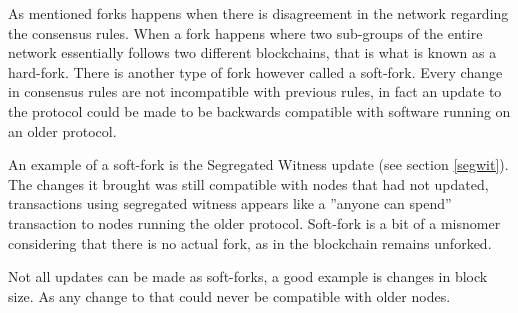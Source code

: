 \label{soft_hard_fork}
As mentioned forks happens when there is disagreement in the network regarding the consensus rules. When a fork happens where two sub-groups of the entire network essentially follows two different blockchains, that is what is known as a hard-fork. There is another type of fork however called a soft-fork.  Every change in consensus rules are not incompatible with previous rules, in fact an update to the protocol could be made to be backwards compatible with software running on an older protocol. 

An example of a soft-fork is the Segregated Witness update (see section \ref{segwit}). The changes it brought was still compatible with nodes that had not updated, transactions using segregated witness appears like a ''anyone can spend'' transaction to nodes running the older protocol. Soft-fork is a bit of a misnomer considering that there is no actual fork, as in the blockchain remains unforked. 

Not all updates can be made as soft-forks, a good example is changes in block size. As any change to that could never be compatible with older nodes.